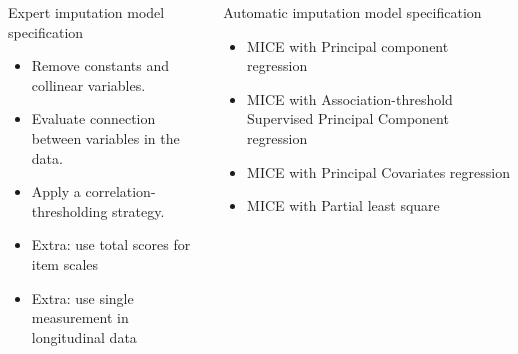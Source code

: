 \documentclass{beamer}\usepackage[]{graphicx}\usepackage[]{xcolor}
\begin{document}
\begin{frame}[fragile]
\bigskip
{\hrulefill}
\bigskip


\begin{columns}[T]
\begin{column}{.46\textwidth}

\begin{block}{Expert imputation model specification}

  \begin{itemize}
      \item Remove constants and collinear variables.
      \item Evaluate connection between variables in the data.
      \item Apply a correlation-thresholding strategy.
      \item Extra: use total scores for item scales
      \item Extra: use single measurement in longitudinal data
  \end{itemize}

\end{block}

\end{column}

\begin{column}{.46\textwidth}

\begin{block}{Automatic imputation model specification}

  \begin{itemize}
    \item MICE with Principal component regression
    \item MICE with Association-threshold Supervised Principal Component regression
    \item MICE with Principal Covariates regression
    \item MICE with Partial least square
  \end{itemize}

\end{block}

\end{column}

\end{columns}

\bigskip
{\hrulefill}
\bigskip



\end{frame}
\end{document}
